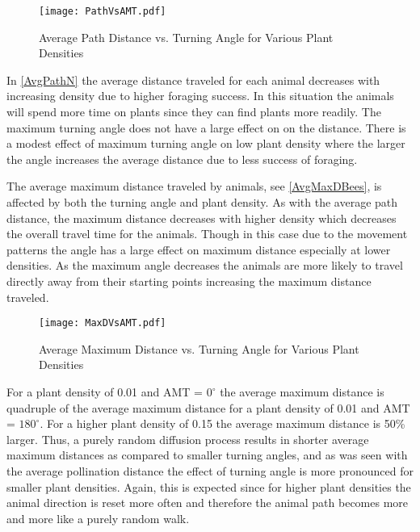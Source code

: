 \begin{figure}
  \begin{center}
  \texttt{[image: PathVsAMT.pdf]}
  \end{center}
  \caption{\small Average Path Distance vs. Turning Angle for Various Plant Densities}
  \label{AvgPathN}
\end{figure}

In \autoref{AvgPathN} the average distance traveled for each animal decreases with increasing
density due to higher foraging success.  In this situation the animals will spend more time on
plants since they can find plants more readily.  The maximum turning angle does not have a large
effect on on the distance.  There is a modest effect of maximum turning angle on low plant density
where the larger the angle increases the average distance due to less success of foraging.

The average maximum distance traveled by animals, see \autoref{AvgMaxDBees}, is affected by both
the turning angle and plant density. As with the average path distance, the maximum distance
decreases with higher density which decreases the overall travel time for the animals.  Though in
this case due to the movement patterns the angle has a large effect on maximum distance especially
at lower densities.  As the maximum angle decreases the animals are more likely to travel directly
away from their starting points increasing the maximum distance traveled.

\begin{figure}
  \begin{center}
  \texttt{[image: MaxDVsAMT.pdf]}
  \end{center}
  \caption{\small Average Maximum Distance vs. Turning Angle for Various Plant Densities}
  \label{AvgMaxDBees}
\end{figure}

For a plant density of 0.01 and AMT = $0^\circ$ the average maximum distance is quadruple of the
average maximum distance for a plant density of 0.01 and AMT = $180^\circ$. For a higher plant
density of 0.15 the average maximum distance is 50\% larger. Thus, a purely random diffusion process
results in shorter average maximum distances as compared to smaller turning angles, and as was seen
with the average pollination distance the effect of turning angle is more pronounced for smaller
plant densities. Again, this is expected since for higher plant densities the animal direction is
reset more often and therefore the animal path becomes more and more like a purely random walk.

